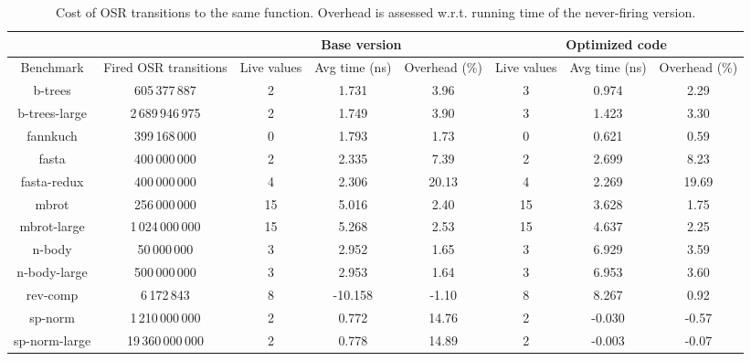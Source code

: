 \begin{description}
\begin{table}[ht]
\begin{center}
\begin{small}
    \begin{tabular}{ |c|c|c|c|c|c|c|c| }
        \cline{3-8}
        \multicolumn{2}{c|}{} & \multicolumn{3}{c|}{Base version} & \multicolumn{3}{c|}{Optimized code} \\
        \hline
        Benchmark & Fired OSR transitions & Live values & Avg time (ns) & Overhead (\%) & Live values & Avg time (ns) & Overhead (\%) \\ 
        \hline
        \hline
        b-trees & 605\,377\,887 & 2 & 1.731 & 3.96 & 3 & 0.974 & 2.29 \\ 
        \hline
        b-trees-large & 2\,689\,946\,975 & 2 & 1.749 & 3.90 & 3 & 1.423 & 3.30 \\ 
        \hline
        fannkuch & 399\,168\,000 & 0 & 1.793 & 1.73 & 0 & 0.621 & 0.59 \\ 
        \hline
        fasta & 400\,000\,000 & 2 & 2.335 & 7.39 & 2 & 2.699 & 8.23 \\ 
        \hline
        fasta-redux & 400\,000\,000 & 4 & 2.306 & 20.13 & 4 & 2.269 & 19.69 \\ 
        \hline
        mbrot & 256\,000\,000 & 15 & 5.016 & 2.40 & 15 & 3.628 & 1.75 \\ 
        \hline
        mbrot-large & 1\,024\,000\,000 & 15 & 5.268 & 2.53 & 15 & 4.637 & 2.25 \\ 
        \hline
        n-body & 50\,000\,000 & 3 & 2.952 & 1.65 & 3 & 6.929 & 3.59 \\ 
        \hline
        n-body-large & 500\,000\,000 & 3 & 2.953 & 1.64 & 3 & 6.953 & 3.60 \\ 
        \hline
        rev-comp & 6\,172\,843 & 8 & -10.158 & -1.10 & 8 & 8.267 & 0.92 \\ 
        \hline
        sp-norm & 1\,210\,000\,000 & 2 & 0.772 & 14.76 & 2 & -0.030 & -0.57 \\ 
        \hline 
        sp-norm-large & 19\,360\,000\,000 & 2 & 0.778 & 14.89 & 2 & -0.003 & -0.07 \\
        \hline
    \end{tabular} 
\end{small}
\end{center}
\caption{\label{tab:sameFun}Cost of OSR transitions to the same function. Overhead is assessed w.r.t. running time of the never-firing version. %
}
\end{table}
\ifauthorea{\newline}{}


\end{description}
